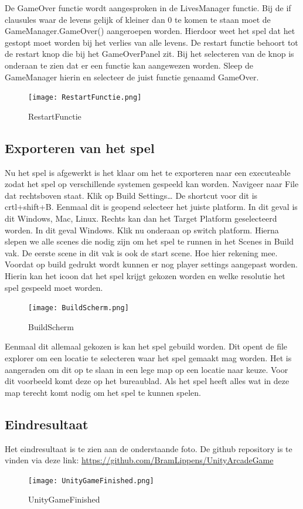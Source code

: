 De GameOver functie wordt aangesproken in de LivesManager functie. Bij de if clausules waar de levens gelijk of kleiner dan 0 te komen te staan moet de GameManager.GameOver() aangeroepen worden. Hierdoor weet het spel dat het gestopt moet worden bij het verlies van alle levens. 
De restart functie behoort tot de restart knop die bij het GameOverPanel zit. Bij het selecteren van de knop is onderaan te zien dat er een functie kan aangewezen worden. Sleep de GameManager hierin en selecteer de juist functie genaamd GameOver.

\begin{figure}[H]
    \centering
    \texttt{[image: RestartFunctie.png]}
    \caption{RestartFunctie}
    \label{fig:RestartFunctie}
\end{figure}

\subsection{ Exporteren van het spel}
Nu het spel is afgewerkt is het klaar om het te exporteren naar een executeable zodat het spel op verschillende systemen gespeeld kan worden. 
Navigeer naar File dat rechtsboven staat. Klik op Build Settings… De shortcut voor dit is crtl+shift+B. Eenmaal dit is geopend selecteer het juiste platform. In dit geval is dit Windows, Mac, Linux. Rechts kan dan het Target Platform geselecteerd worden. In dit geval Windows. Klik nu onderaan op switch platform. Hierna slepen we alle scenes die nodig zijn om het spel te runnen in het Scenes in Build vak. De eerste scene in dit vak is ook de start scene. Hoe hier rekening mee.
Voordat op build gedrukt wordt kunnen er nog player settings aangepast worden. Hierin kan het icoon dat het spel krijgt gekozen worden en welke resolutie het spel gespeeld moet worden.

\begin{figure}[H]
    \centering
    \texttt{[image: BuildScherm.png]}
    \caption{BuildScherm}
    \label{fig:BuildScherm}
\end{figure}
Eenmaal dit allemaal gekozen is kan het spel gebuild worden. Dit opent de file explorer om een locatie te selecteren waar het spel gemaakt mag worden. Het is aangeraden om dit op te slaan in een lege map op een locatie naar keuze. Voor dit voorbeeld komt deze op het bureaublad. Als het spel heeft alles wat in deze map terecht komt nodig om het spel te kunnen spelen.
\subsection{Eindresultaat}
Het eindresultaat is te zien aan de onderstaande foto. De github repository is te vinden via deze link: \url{https://github.com/BramLippens/UnityArcadeGame}
\begin{figure}[H]
    \centering
    \texttt{[image: UnityGameFinished.png]}
    \caption{UnityGameFinished}
    \label{fig:UnityGameFinished}
\end{figure}
